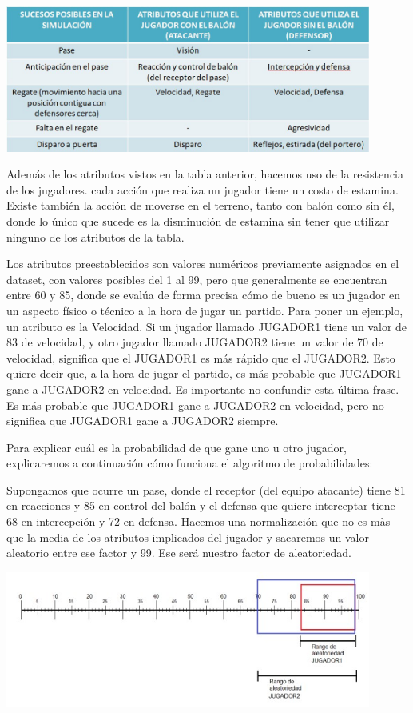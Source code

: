 \documentclass{article}
\begin{document}
\includegraphics*[width=0.9\textwidth]{attributed_table.jpg}
\bigskip

Además de los atributos vistos en la tabla anterior, hacemos uso de la resistencia de los jugadores. cada acción que realiza un jugador tiene un costo de estamina. Existe también la acción de moverse en  el terreno, tanto con balón como sin él, donde lo único que sucede es la disminución de estamina sin tener que utilizar ninguno de los atributos de la tabla.

Los atributos preestablecidos son valores numéricos previamente asignados en el dataset, con valores posibles del 1 al 
99, pero que generalmente se encuentran entre 60 y 85, donde se evalúa de forma precisa cómo de bueno es un jugador en 
un aspecto físico o técnico a la hora de jugar un partido. Para poner un ejemplo, un atributo es la Velocidad. Si un 
jugador llamado JUGADOR1 tiene un valor de 83 de velocidad, y otro jugador llamado JUGADOR2 tiene un valor de 70 de 
velocidad, significa que el JUGADOR1 es más rápido que el JUGADOR2. Esto quiere decir que, a la hora de jugar el 
partido, es más probable que JUGADOR1 gane a JUGADOR2 en velocidad. Es importante no confundir esta última frase. 
Es más probable que JUGADOR1 gane a JUGADOR2 en velocidad, pero no significa que JUGADOR1 gane a JUGADOR2 siempre.

Para explicar cuál es la probabilidad de que gane uno u otro jugador,
explicaremos a continuación cómo funciona el algoritmo de probabilidades:

Supongamos que ocurre un pase, donde el receptor (del equipo atacante) tiene 81 en reacciones y 85 en control del 
balón y el defensa que quiere interceptar tiene 68 en intercepción y 72 en defensa. Hacemos una normalización que 
no es màs que la media de los atributos implicados del jugador y sacaremos un valor aleatorio entre ese factor y 99. 
Ese será nuestro factor de aleatoriedad.


\includegraphics*[width=0.9\textwidth]{rank.jpg}
\bigskip
\end{document}
